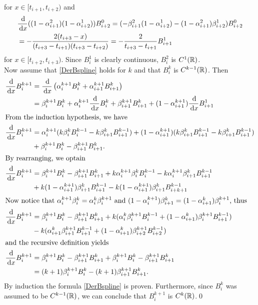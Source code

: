 for $x\in [t_{i+1},t_{i+2})$ and
\begin{align}
  &\frac{\,{\rm d}}{\,{\rm d} x} ((1-\alpha_{i+1}^2)(1-\alpha_{i+2}^1))B_{i+2}^0 = (-\beta_{i+1}^2(1-\alpha_{i+2}^1) -(1-\alpha_{i+1}^2)\beta_{i+2}^1)B_{i+2}^0\\
  &= - \frac{2(t_{i+3}-x)}{(t_{i+3}-t_{i+1})(t_{i+3}-t_{i+2})} = -\frac{2}{t_{i+3}-t_{i+1}}B_{i+1}^1
\end{align}
for $x\in [t_{i+2},t_{i+3})$. Since $B_i^1$ is clearly continuous, $B_i^2$ is $C^{1}(\mathbb R)$.\\

Now assume that \eqref{DerBspline} holds for $k$ and that $B_i^k$ is $C^{k-1}(\mathbb R)$. Then 
\begin{align}
  \frac{\,{\rm d}}{\,{\rm d} x} B_i^{k+1} &= \frac{\,{\rm d}}{\,{\rm d} x} \left(\alpha_i^{k+1} B_i^k + \alpha_{i+1}^{k+1}B_{i+1}^k\right)\\
  &= \beta_i^{k+1} B_i^k + \alpha_i^{k+1} \frac{\,{\rm d}}{\,{\rm d} x}B_i^k + \beta_{i+1}^{k+1} B_{i+1}^k + (1-\alpha_{i+1}^{k+1}) \frac{\,{\rm d}}{\,{\rm d} x}B_{i+1}^1\\
  \intertext{From the induction hypothesis, we have}
  \frac{\,{\rm d}}{\,{\rm d} x} B_i^{k+1} &= \alpha_i^{k+1}(k\beta_i^{k}B_i^{k-1} - k\beta_{i+1}^{k}B_{i+1}^{k-1}) + (1-\alpha_{i+1}^{k+1})(k\beta_{i+1}^{k}B_{i+1}^{k-1} - k\beta_{i+1}^k B_{i+1}^{k-1})\\
  &+ \beta_i^{k+1}B_i^k - \beta_{i+1}^{k+1}B_{i+1}^k.\\
  \intertext{By rearranging, we optain}
  \frac{\,{\rm d}}{\,{\rm d} x} B_i^{k+1} &= \beta_i^{k+1} B_i^k - \beta_{i+1}^{k+1}B_{i+1}^k + k\alpha_i^{k+1}\beta_i^kB_i^{k-1} - k\alpha_i^{k+1}\beta_{i+1}^kB_{i+1}^{k-1}\\
  &+ k(1-\alpha_{i+1}^{k+1})\beta_{i+1}^kB_{i+1}^{k-1} - k(1-\alpha_{i+1}^{k+1})\beta_{i+1}^kB_{i+{k+1}}^{k-1}\\
  \intertext{Now notice that $\alpha_i^{k+1}\beta_i^{k} = \alpha_i^{k}\beta_i^{k+1}$ and $(1-\alpha_i^{k+1})\beta_{i+1}^{k} = (1-\alpha_{i+1}^{k})\beta_{i}^{k+1}$, thus}
  \frac{\,{\rm d}}{\,{\rm d} x} B_i^{k+1} &= \beta_i^{k+1} B_i^k - \beta_{i+1}^{k+1}B_{i+1}^k + k(\alpha_i^k\beta_i^{k+1}B_i^{k-1} + (1-\alpha_{i+1}^k)\beta_{i}^{k+1}B_{i+1}^{k-1})\\
  &- k(\alpha_{i+1}^k\beta_{i+1}^{k+1}B_{i+1}^{k-1} + (1-\alpha_{i+1}^k)\beta_{i+2}^{k+1}B_{i+2}^{k-1})\\
  \intertext{and the recursive definition yields}
  \frac{\,{\rm d}}{\,{\rm d} x} B_i^{k+1} &= \beta_i^{k+1} B_i^k - \beta_{i+1}^{k+1}B_{i+1}^k + \beta_{i}^{k+1}B_i^k - \beta_{i+1}^{k+1} B_{i+1}^k\\
  &= (k+1)\beta_{i}^{k+1}B_i^k - (k+1)\beta_{i+1}^{k+1} B_{i+1}^k.
\end{align}
By induction the formula \eqref{DerBspline} is proven. Furthermore, since $B_i^k$ was assumed to be $C^{k-1}(\mathbb R)$, we can conclude that $B_i^{k+1}$ is $C^k(\mathbb R)$.\hfill\qed\\

